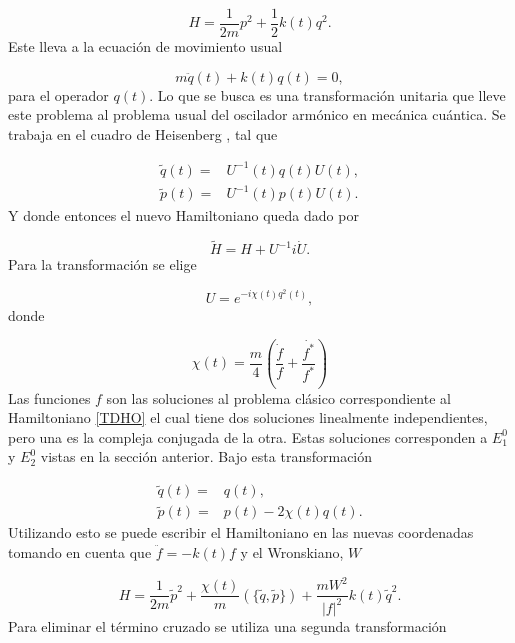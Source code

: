 \documentclass[10pt,a4paper]{report}
\begin{document}
\begin{equation}\label{TDHO}
H = \frac{1}{2m}p^2 + \frac{1}{2}k(t)q^2.
\end{equation} Este lleva a la ecuación de movimiento usual

\begin{equation}
m\ddot{q}(t) + k(t)q(t) = 0,
\end{equation} para el operador $q(t)$. Lo que se busca es una transformación unitaria que lleve este problema al problema usual del oscilador armónico en mecánica cuántica. Se trabaja en el cuadro de Heisenberg \cite{SakuraiQM}, tal que

\begin{align}
\tilde{q}(t) =& U^{-1}(t)q(t)U(t),\\
\tilde{p}(t) =& U^{-1}(t)p(t)U(t).
\end{align} Y donde entonces el nuevo Hamiltoniano queda dado por

\begin{equation}
\tilde{H} = H + U^{-1}i\dot{U}.
\end{equation} Para la transformación se elige

\begin{equation}
U = e^{-i\chi(t)q^2(t)},
\end{equation} donde

\begin{equation}
\chi(t) = \frac{m}{4}(\frac{\dot{f}}{f}+\frac{\dot{f^*}}{f^*})
\end{equation} Las funciones $f$ son las soluciones al problema clásico correspondiente al Hamiltoniano \eqref{TDHO} el cual tiene dos soluciones linealmente independientes, pero una es la compleja conjugada de la otra. Estas soluciones corresponden a $E_1^0$  y $E_2^0$ vistas en la sección anterior. Bajo esta transformación

\begin{align}
\tilde{q}(t)=&q(t),\\
\tilde{p}(t)=&p(t)-2\chi(t)q(t).
\end{align}Utilizando esto se puede escribir el Hamiltoniano en las nuevas coordenadas tomando en cuenta que $\ddot{f}= -k(t)f$ y el Wronskiano, $W$

\begin{equation}
 H = \frac{1}{2m}\tilde{p}^2 + \frac{\chi(t)}{m}(\{\tilde{q},\tilde{p}\}) + \frac{mW^2}{|f|^2}k(t)\tilde{q}^2.
\end{equation}Para eliminar el término cruzado se utiliza una segunda transformación
\end{document}
